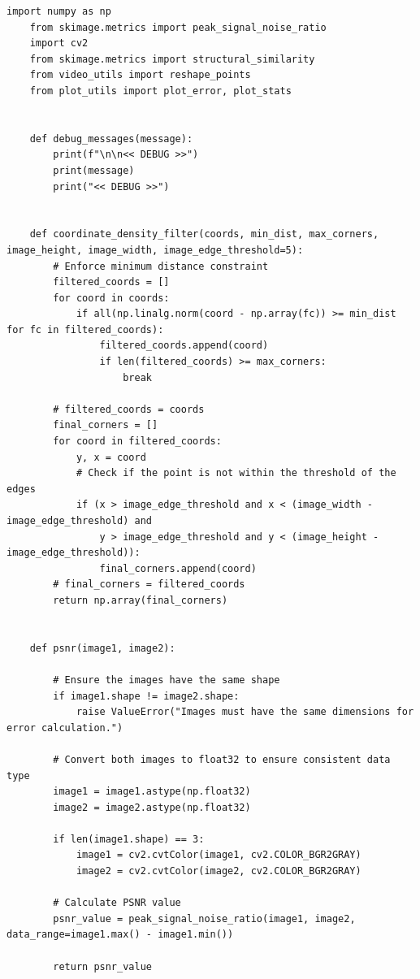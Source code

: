 \documentclass[11pt, conference, letterpaper]{IEEEtran}
\begin{document}
\begin{lstlisting}[style=python, caption={\texttt{utils.py}}, label={lst:utils}]
    import numpy as np
    from skimage.metrics import peak_signal_noise_ratio
    import cv2
    from skimage.metrics import structural_similarity
    from video_utils import reshape_points
    from plot_utils import plot_error, plot_stats
    
    
    def debug_messages(message):
        print(f"\n\n<< DEBUG >>")
        print(message)
        print("<< DEBUG >>")
        
        
    def coordinate_density_filter(coords, min_dist, max_corners, image_height, image_width, image_edge_threshold=5):
        # Enforce minimum distance constraint
        filtered_coords = []
        for coord in coords:
            if all(np.linalg.norm(coord - np.array(fc)) >= min_dist for fc in filtered_coords):
                filtered_coords.append(coord)
                if len(filtered_coords) >= max_corners:
                    break
        
        # filtered_coords = coords
        final_corners = []    
        for coord in filtered_coords:
            y, x = coord
            # Check if the point is not within the threshold of the edges
            if (x > image_edge_threshold and x < (image_width - image_edge_threshold) and
                y > image_edge_threshold and y < (image_height - image_edge_threshold)):
                final_corners.append(coord)
        # final_corners = filtered_coords
        return np.array(final_corners)
    
    
    def psnr(image1, image2):
       
        # Ensure the images have the same shape
        if image1.shape != image2.shape:
            raise ValueError("Images must have the same dimensions for error calculation.")
    
        # Convert both images to float32 to ensure consistent data type
        image1 = image1.astype(np.float32)
        image2 = image2.astype(np.float32)
        
        if len(image1.shape) == 3:
            image1 = cv2.cvtColor(image1, cv2.COLOR_BGR2GRAY)
            image2 = cv2.cvtColor(image2, cv2.COLOR_BGR2GRAY)
        
        # Calculate PSNR value
        psnr_value = peak_signal_noise_ratio(image1, image2, data_range=image1.max() - image1.min())
    
        return psnr_value
    

\end{lstlisting}
\end{document}
